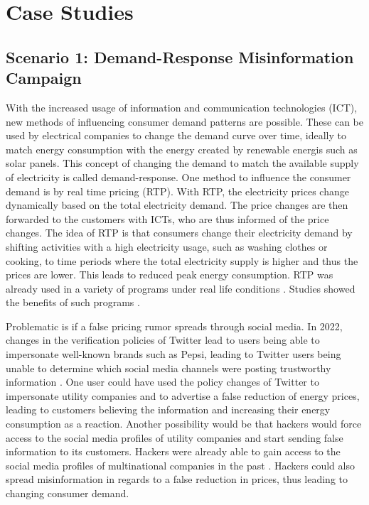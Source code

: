 \chapter{Case Studies}




\section{Scenario 1: Demand-Response Misinformation Campaign}
\label{demandresponsesection}

With the increased usage of information and communication 
technologies (ICT), new methods of influencing
consumer demand patterns are possible. 
These can be used by electrical companies to change the 
demand curve over time, ideally to match energy consumption
with the energy created by renewable energis such 
as solar panels. 
This concept of changing the demand to match the 
available supply of electricity is called demand-response. 
One method to influence the consumer demand is by real time 
pricing (RTP). With RTP, the electricity prices change
dynamically based on the total electricity demand.
The price changes are then forwarded to the customers with ICTs, 
who are thus informed of the price changes.
The idea of RTP is that consumers change their electricity demand
by shifting activities with a high electricity usage, 
such as washing clothes or cooking, to time periods 
where the total electricity supply is higher and thus the prices
are lower. This leads to reduced peak energy consumption. 
RTP was already used in a variety of programs
under real life conditions \cite{barbose2004survey}.
Studies showed the benefits of such programs \cite{albadi2008summary}.

Problematic is if a false pricing rumor spreads through social media.
In 2022, changes in the verification policies of Twitter lead to users being able 
to impersonate well-known brands such as Pepsi, leading to Twitter 
users being unable to determine which social media channels were
posting trustworthy information \cite{twitterchaos}. One user could
have used the policy changes of Twitter to impersonate 	utility companies
and to advertise a false reduction of energy prices, leading to customers
believing the information and increasing their energy consumption as a 
reaction. Another possibility would be that hackers would force access to the
social media profiles of utility companies and start sending false 
information to its customers. Hackers were already able to gain access
to the social media profiles of multinational companies in the past
\cite{twitterhacker}. Hackers could also spread misinformation in regards
to a false reduction in prices, thus leading to changing consumer demand.

